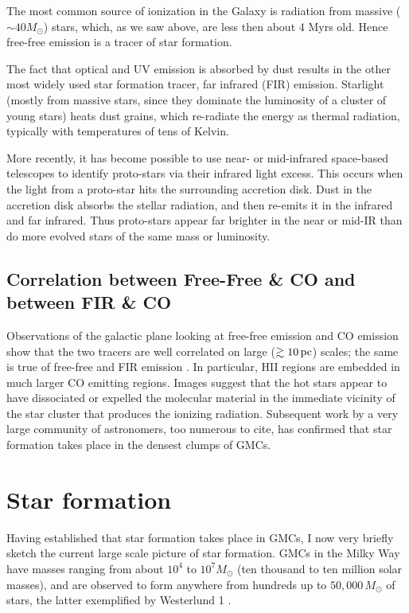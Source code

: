 \documentclass[../dissertation.tex]{subfiles}
\begin{document}
The most common source of ionization in the Galaxy is radiation from massive ($\sim 40M_\odot$) stars, which, as we saw above, are less then about 4 Myrs old. Hence free-free emission is a tracer of star formation.

The fact that optical and UV emission is absorbed by dust results in the other most widely used star formation tracer, far infrared (FIR) emission. Starlight (mostly from massive stars, since they dominate the luminosity of a cluster of young stars) heats dust grains, which re-radiate the energy as thermal radiation, typically with temperatures of tens of Kelvin. 

More recently, it has become possible to use near- or mid-infrared space-based telescopes to identify proto-stars via their infrared light excess. 
This occurs when the light from a proto-star hits the surrounding accretion disk. Dust in the accretion disk absorbs the stellar radiation, and then re-emits it in the infrared and far infrared. Thus proto-stars appear far brighter in the near or mid-IR than do more evolved stars of the same mass or luminosity. 

\subsection{Correlation between Free-Free \& CO and between FIR \& CO} \label{sec:Intro_FF_and_CO}

Observations of the galactic plane looking at free-free emission and CO emission show that the two tracers are well correlated on large ($\gtrsim 10 \,\rm pc$) scales; the same is true of free-free and FIR emission \citep{1989ApJ...339..149S,1988ApJ...334L..51M}. In particular, HII regions are embedded in much larger CO emitting regions. Images suggest that the hot stars appear to have dissociated or expelled the molecular material in the immediate vicinity of the star cluster that produces the ionizing radiation.
Subsequent work by a very large community of astronomers, too numerous to cite, has confirmed that star formation takes place in the densest clumps of GMCs.


\section{Star formation}
Having established that star formation takes place in GMCs, I now very briefly sketch the current large scale picture of star formation.
GMCs in the Milky Way have masses ranging from about $10^4$ to $10^7M_\odot$ (ten thousand to ten million solar masses), 
and are observed to form anywhere from hundreds up to $50,000\,M_\odot$ of stars, the latter exemplified by Westerlund 1 \citep{2017A&A...602A..22A}. 
\end{document}
